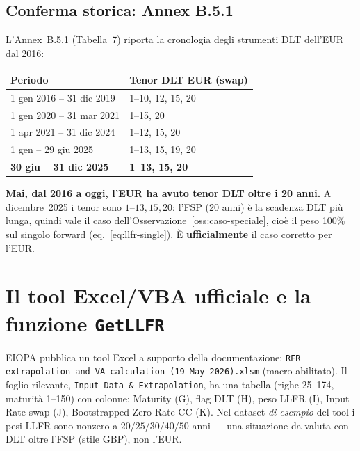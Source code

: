 \documentclass[11pt,a4paper]{article}
\theoremstyle{definition}
\theoremstyle{remark}
\begin{document}
\subsection{Conferma storica: Annex B.5.1}
\label{sec:annexB}

L'Annex~B.5.1 (Tabella~7) riporta la cronologia degli strumenti DLT dell'EUR dal 2016:

\begin{center}\small
\renewcommand{\arraystretch}{1.15}
\begin{tabular}{ll}
\toprule
\textbf{Periodo} & \textbf{Tenor DLT EUR (swap)} \\
\midrule
1 gen 2016 -- 31 dic 2019 & 1--10, 12, 15, 20 \\
1 gen 2020 -- 31 mar 2021 & 1--15, 20 \\
1 apr 2021 -- 31 dic 2024 & 1--12, 15, 20 \\
1 gen -- 29 giu 2025 & 1--13, 15, 19, 20 \\
\rowcolor{rowtint} \textbf{30 giu -- 31 dic 2025} & \textbf{1--13, 15, 20} \\
\bottomrule
\end{tabular}
\end{center}

\textbf{Mai, dal 2016 a oggi, l'EUR ha avuto tenor DLT oltre i 20 anni.} A dicembre~2025 i
tenor sono $1$--$13,15,20$: l'FSP (20 anni) \`e la scadenza DLT pi\`u lunga, quindi vale il
caso dell'Osservazione~\ref{oss:caso-speciale}, cio\`e il peso 100\% sul singolo forward
(eq.~\eqref{eq:llfr-single}). \`E \textbf{ufficialmente} il caso corretto per l'EUR.

\section{Il tool Excel/VBA ufficiale e la funzione \texttt{GetLLFR}}
\label{sec:tool}

EIOPA pubblica un tool Excel a supporto della documentazione:
\texttt{RFR extrapolation and VA calculation (19 May 2026).xlsm} (macro-abilitato). Il foglio
rilevante, \texttt{Input Data \& Extrapolation}, ha una tabella (righe 25--174, maturit\`a
1--150) con colonne: Maturity (G), flag DLT (H), peso LLFR (I), Input Rate swap (J),
Bootstrapped Zero Rate CC (K). Nel dataset \emph{di esempio} del tool i pesi LLFR sono nonzero
a $20/25/30/40/50$ anni --- una situazione da valuta con DLT oltre l'FSP (stile GBP), non
l'EUR.
\end{document}
